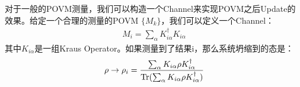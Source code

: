 \bigskip
{}

对于一般的POVM测量，我们可以构造一个Channel来实现POVM之后Update的效果。给定一个合理的测量的POVM $ \{ M_k \} $，我们可以定义一个Channel：
\begin{align}
  M_i=\sum_\alpha K_{i\alpha}^\dagger K_{i\alpha}
\end{align}
其中$ K_{i\alpha} $是一组Kraus Operator。如果测量到了结果i，那么系统坍缩到的态是：\begin{align}
  \rho \rightarrow \rho_i = \frac{\sum_\alpha K_{i\alpha} \rho K_{i\alpha}^\dagger}{\operatorname{Tr}(\sum_\alpha K_{i\alpha} \rho K_{i\alpha}^\dagger)}
\end{align}



